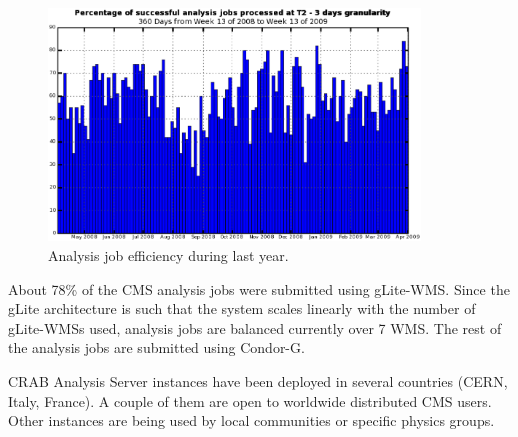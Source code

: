 \begin{figure}
\centering
\includegraphics[width=0.88\textwidth]{T2EffApril0809.eps}
\caption{Analysis job efficiency during last year. }
\label{fig:T2EffApril0809}
\end{figure}

About 78\% of the CMS analysis jobs were submitted using gLite-WMS.  Since the gLite architecture is such that the system scales linearly with the number of gLite-WMSs used, analysis jobs are balanced currently over 7 WMS. The rest of the analysis jobs are submitted using Condor-G.

CRAB Analysis Server instances have been deployed in several countries (CERN, Italy, France). A couple of them are open to worldwide distributed CMS users. Other instances are being used by local communities or specific physics groups.

